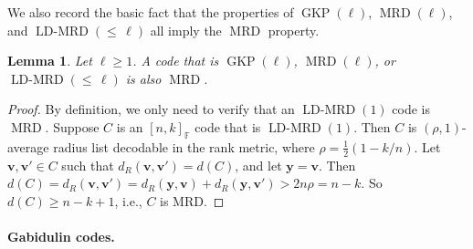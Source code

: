 \documentclass[11pt]{article}
\newif\ifmynotes
\newcommand{\ZGnote}[1]{\ifmynotes\textcolor{purple}{[Zeyu: #1]}\else\fi}
\theoremstyle{plain}
\newtheorem{lemma}[thm]{Lemma}
\theoremstyle{definition}
\theoremstyle{remark}
\newcommand{\ldmrd}[1]{\operatorname{LD-MRD}({\leq}\,#1)}
\newcommand{\F}{\mathbb{F}}
\newcommand{\bv}{\bm{v}}
\newcommand{\bu}{\bm{u}}
\newcommand{\by}{\bm{y}}
\newcommand{\rank}{\mathrm{rank}}
\begin{document}
We also record the basic fact that the properties of $\operatorname{GKP}(\ell)$, $\operatorname{MRD}(\ell)$, and $\ldmrd{\ell}$ all imply the $\operatorname{MRD}$ property.
\begin{lemma}\label{lem:strengthen}
Let $\ell\geq 1$. A code that is $\operatorname{GKP}(\ell)$, $\operatorname{MRD}(\ell)$, or $\ldmrd{\ell}$ is also $\operatorname{MRD}$.
\end{lemma}

\begin{proof}
By definition, we only need to verify that an $\operatorname{LD-MRD}(1)$ code is $\operatorname{MRD}$. Suppose $C$ is an $[n,k]_{\F}$ code that is $\operatorname{LD-MRD}(1)$. Then $C$ is $\left(\rho,1\right)$-average radius list decodable in the rank metric, where $\rho=\frac{1}{2}(1-k/n)$. Let $\bv, \bv'\in C$ such that $d_R(\bv,\bv')=d(C)$, and let $\by=\bv$. Then $d(C)=d_R(\bv,\bv')=d_R(\by, \bv)+d_R(\by,\bv')>2n\rho=n-k$. So $d(C)\geq n-k+1$, i.e., $C$ is MRD.
\end{proof}
%
%


\paragraph{Gabidulin codes.}
\end{document}
